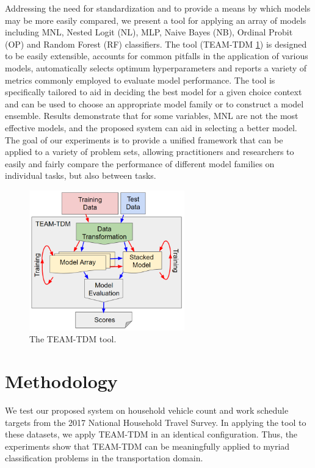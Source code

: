 \documentclass[numbered]{trbunofficial}
\begin{document}
Addressing the need for standardization and to provide a means by which models may be more easily compared, we present a tool for applying an array of models including MNL, Nested Logit (NL), MLP, Naive Bayes (NB), Ordinal Probit (OP) and Random Forest (RF) classifiers. 
 The tool (TEAM-TDM \ref{fig:flowchart}) is designed to be easily extensible, accounts for common pitfalls in the application of various models, automatically selects optimum hyperparameters and reports a variety of metrics commonly employed to evaluate model performance. 
 The tool is specifically tailored to aid in deciding the best model for a given choice context and can be used to choose an appropriate model family or to construct a model ensemble. 
 Results demonstrate that for some variables, MNL are not the most effective models, and the proposed system can aid in selecting a better model.
 The goal of our experiments is to provide a unified framework that can be applied to a variety of problem sets, allowing practitioners and researchers to easily and fairly compare the performance of different model families on individual tasks, but also between tasks.

\begin{figure}[!ht]
  \centering
  \includegraphics[width=0.6\textwidth]{flowchart}
  \caption{The TEAM-TDM tool.}\label{fig:flowchart}
\end{figure}



\section{Methodology} \label{section:introduction}

We test our proposed system on household vehicle count and work schedule targets from the 2017 National Household Travel Survey.
 In applying the tool to these datasets, we apply TEAM-TDM in an identical configuration.
 Thus, the experiments show that TEAM-TDM can be meaningfully applied to myriad classification problems in the transportation domain.
\end{document}
